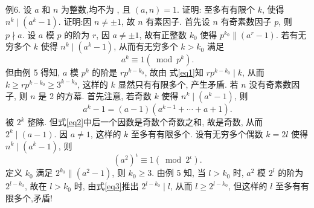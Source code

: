 例6. 设 $a$ 和 $n$ 为整数,均不为  , 且 $(a, n)=1$. 证明: 至多有有限个 $k$, 使得 $n^k \mid\left(a^k-1\right)$.
证明:因 $n \neq \pm 1$, 故 $n$ 有素因子.
首先设 $n$ 有奇素数因子 $p$, 则 $p \nmid a$. 设 $a$ 模 $p$ 的阶为 $r$, 因 $a \neq \pm 1$, 故有正整数 $k_0$ 使得 $p^{k_0} \|\left(a^r-1\right)$.
若有无穷多个 $k$ 使得 $n^k \mid\left(a^k-1\right)$, 从而有无穷多个 $k>k_0$ 满足
$$
a^k \equiv 1\left(\bmod p^k\right) . \label{eq1}
$$
但由例 5 得知, $a$ 模 $p^k$ 的阶是 $r p^{k-k_0}$, 故由 式\ref{eq1}知 $r p^{k-k_0} \mid k$, 从而 $k \geqslant r p^{k-k_0} \geqslant 3^{k-k_0}$, 这样的 $k$ 显然只有有限多个, 产生矛盾.
若 $n$ 没有奇素数因子, 则 $n$ 是 2 的方幕.
首先注意, 若奇数 $k$ 使得 $n^k \mid\left(a^k-1\right)$, 则
$$
a^k-1=(a-1)\left(a^{k-1}+\cdots+a+1\right) . \label{eq2}
$$
被 $2^k$ 整除.
但式\ref{eq2}中后一个因数是奇数个奇数之和, 故是奇数, 从而 $2^k \mid(a-1)$. 因 $a \neq 1$, 这样的 $k$ 至多有有限多个.
设有无穷多个偶数 $k=2 l$ 使得 $n^k \mid\left(a^k-1\right)$, 则
$$
\left(a^2\right)^\iota \equiv 1\left(\bmod 2^\iota\right) . \label{eq3}
$$
定义 $k_0$ 满足 $2^{k_0} \|\left(a^2-1\right)$, 则 $k_0 \geqslant 3$. 由例 5 知, 当 $l>k_0$ 时, $a^2$ 模 $2^l$ 的阶为 $2^{l-k_0}$, 故在 $l>k_0$ 时, 由式\ref{eq3}推出 $2^{l-k_0} \mid l$, 从而 $l \geqslant 2^{l-k_0}$, 但这样的 $l$ 至多有有限多个,矛盾!



